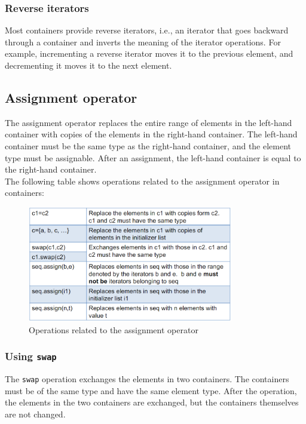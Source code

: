 \subsubsection{Reverse iterators}

Most containers provide reverse iterators, i.e., an iterator that goes backward through a 
container and inverts the meaning of the iterator operations. For example, incrementing a
reverse iterator moves it to the previous element, and decrementing it moves it to the next
element.

\subsection{Assignment operator}

The assignment operator replaces the entire range of elements in the left-hand container with
copies of the elements in the right-hand container. The left-hand container must be the same
type as the right-hand container, and the element type must be assignable. After an assignment,
the left-hand container is equal to the right-hand container.\\

The following table shows operations related to the assignment operator in containers:

\begin{figure}[H]
    \centering
    \includegraphics[width=0.8\textwidth]{figures/assignment_ops.png}
    \caption{Operations related to the assignment operator}
    \label{fig:assignment_ops}
\end{figure}

\subsubsection{Using \texttt{swap}}

The \texttt{swap} operation exchanges the elements in two containers. The containers must be of
the same type and have the same element type. After the operation, the elements in the two 
containers are exchanged, but the containers themselves are not changed.\\

